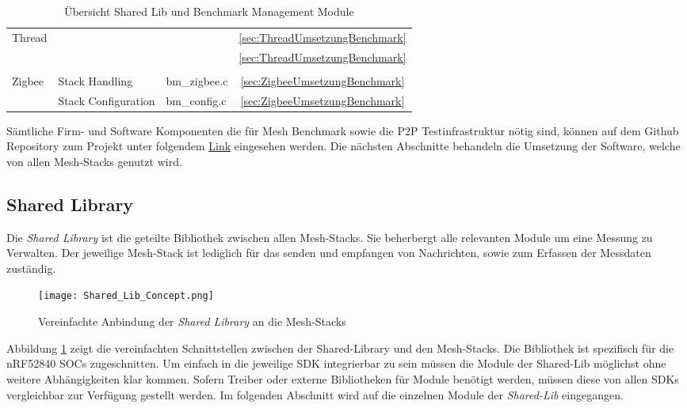 \begin{table}
\begin{tabular}{|l|l|l|c|}
\hline
\multirow{2}{*}{Thread} &  &  & \ref{sec:ThreadUmsetzungBenchmark} \\ 
\cline{2-4}
 &  &  & \ref{sec:ThreadUmsetzungBenchmark} \\ 
\hline
\multicolumn{1}{l}{} & \multicolumn{1}{l}{} & \multicolumn{1}{l}{} & \multicolumn{1}{l}{} \\ 
\hline
\multirow{2}{*}{Zigbee} & Stack Handling & bm\_zigbee.c & \ref{sec:ZigbeeUmsetzungBenchmark} \\ 
\cline{2-4}
 & Stack Configuration & bm\_config.c & \ref{sec:ZigbeeUmsetzungBenchmark} \\
\hline
\end{tabular}
\caption{Übersicht Shared Lib und Benchmark Management Module}
\label{tab:UebersichtSoftware}
\end{table}


Sämtliche Firm- und Software Komponenten die für Mesh Benchmark sowie die P2P Testinfrastruktur nötig sind, können auf dem Github Repository zum Projekt unter folgendem \href{https://github.com/Rouben94/P6_Software}{Link\footnotemark[\value{footnote}]}  eingesehen werden. Die nächsten Abschnitte behandeln die Umsetzung der Software, welche von allen Mesh-Stacks genutzt wird.





\subsection{Shared Library}\label{subsec:SharedLibrary}

Die \textit{Shared Library} ist die geteilte Bibliothek zwischen allen Mesh-Stacks. Sie beherbergt alle relevanten Module um eine Messung zu Verwalten. Der jeweilige Mesh-Stack ist lediglich für das senden und empfangen von Nachrichten, sowie zum Erfassen der Messdaten zuständig. 


\begin{figure}[H]
	\centering
	\texttt{[image: Shared\_Lib\_Concept.png]}
	\caption{Vereinfachte Anbindung der \textit{Shared Library} an die Mesh-Stacks}\label{fig:ShardeLibConcept}
\end{figure}

Abbildung \ref{fig:ShardeLibConcept} zeigt die vereinfachten Schnittstellen zwischen der Shared-Library und den Mesh-Stacks. Die Bibliothek ist spezifisch für die nRF52840 SOCs zugeschnitten. Um einfach in die jeweilige SDK integrierbar zu sein müssen die Module der Shared-Lib möglichst ohne weitere Abhängigkeiten klar kommen. Sofern Treiber oder externe Bibliotheken für Module benötigt werden, müssen diese von allen SDKs vergleichbar zur Verfügung gestellt werden. Im folgenden Abschnitt wird auf die einzelnen Module der \textit{Shared-Lib} eingegangen. 


